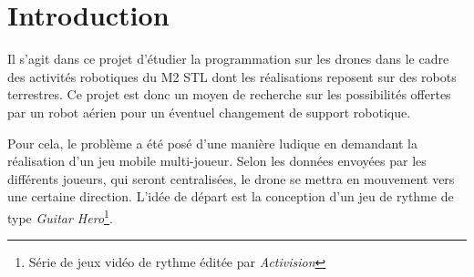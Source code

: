 \section{Introduction}
Il s'agit dans ce projet d'étudier la programmation sur les drones dans le cadre des activités robotiques du M2 STL dont les réalisations reposent sur des robots terrestres. Ce projet est donc un moyen de recherche sur les possibilités offertes par un robot aérien pour un éventuel changement de support robotique.

Pour cela, le problème a été posé d'une manière ludique en demandant la réalisation d'un jeu mobile multi-joueur. Selon les données envoyées par les différents joueurs, qui seront centralisées, le drone se mettra en mouvement vers une certaine direction. L'idée de départ est la conception d'un jeu de rythme de type \textit{Guitar Hero}\footnote{Série de jeux vidéo de rythme éditée par \textit{Activision}}.